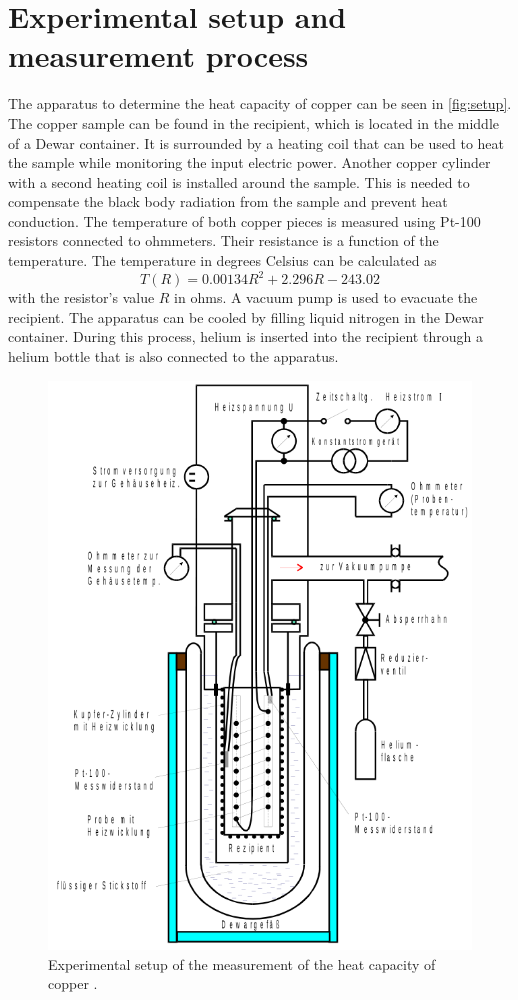 \section{Experimental setup and measurement process}
\label{sec:Setup}
The apparatus to determine the heat capacity of copper can be seen in \autoref{fig:setup}.
The copper sample can be found in the recipient, which is located in the middle of a Dewar container. It is surrounded by a heating coil that can be used to
heat the sample while monitoring the input electric power. Another copper cylinder with a second heating coil is installed around the sample. This is needed to compensate the
black body radiation from the sample and prevent heat conduction.
The temperature of both copper pieces is measured using Pt-100 resistors connected to ohmmeters. Their resistance is a function of the temperature. The temperature in degrees Celsius can be calculated as
\begin{equation}
    \label{eqn:R_T}
    T(R) = \num{0.00134} R^2 + \num{2.296} R - \num{243.02}
\end{equation}
with the resistor's value $R$ in ohms.
A vacuum pump is used to evacuate the recipient. The apparatus can be cooled by filling liquid nitrogen in the Dewar container. During this process, helium is inserted into the recipient
through a helium bottle that is also connected to the apparatus.

\begin{figure}
    \centering
    \includegraphics[width = .55\textwidth]{"content/pics/setup.png"}
    \caption{Experimental setup of the measurement of the heat capacity of copper \cite{V47}.}
    \label{fig:setup}
\end{figure}

